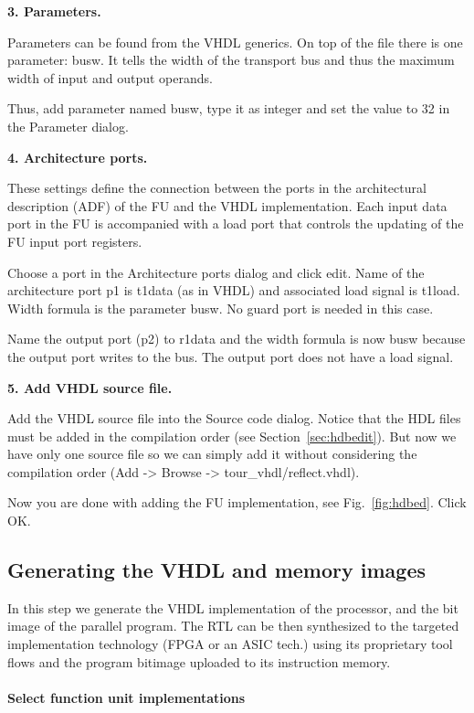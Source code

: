\documentclass[twoside]{tceusermanual}
\begin{document}
\begin{enumerate}
\textbf{3. Parameters.}

Parameters can be found from the VHDL generics. On top of the file there is one
parameter: busw. It tells the width of the transport bus and thus the maximum
width of input and output operands.

Thus, add parameter named busw, type it as integer and set the value to 32 in the
Parameter dialog.

\textbf{4. Architecture ports.}

These settings define the connection between the ports in the
architectural description (ADF) of the FU and the VHDL implementation.
Each input data port in the FU is accompanied with a load port that
controls the updating of the FU input port registers.

Choose a port in the Architecture ports dialog and click edit.  Name
of the architecture port p1 is t1data (as in VHDL) and associated load
signal is t1load.  Width formula is the parameter busw. No guard port is
needed in this case.

Name the output port (p2) to r1data and the width formula is now busw
because the output port writes to the bus.
The output port does not have a load signal.

\textbf{5. Add VHDL source file.}

Add the VHDL source file into the Source code dialog. Notice that the HDL
files must be added in the compilation order (see Section~\ref{sec:hdbedit}).
But now we have only one source file so we can simply add it without
considering the compilation order (Add -> Browse -> tour\_vhdl/reflect.vhdl).

Now you are done with adding the FU implementation, see Fig.~\ref{fig:hdbed}. Click OK.

\end{enumerate}

\subsection{Generating the VHDL and memory images}
\label{ssec:tcetour_final_products}

In this step we generate the VHDL implementation of the processor, and the
bit image of the parallel program. The RTL can be then synthesized to the
targeted implementation technology (FPGA or an ASIC tech.) using its proprietary
tool flows and the program bitimage uploaded to its instruction memory.

\paragraph{Select function unit implementations}
\end{document}
